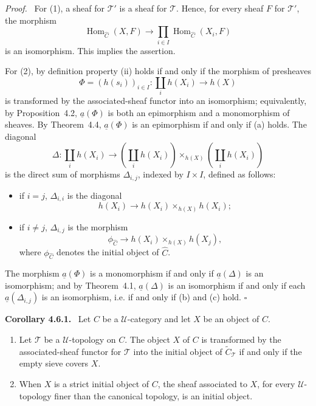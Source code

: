 \documentclass[11pt]{article}
\newcommand{\U}{\mathcal{U}}
\newcommand{\Hom}{\operatorname{Hom}}
\newcommand{\qedtext}{\hfill\(\square\)}
\newenvironment{statement}[1]{\par\medskip\noindent\textbf{#1.}\ }{\par\medskip}
\newenvironment{prooftext}{\par\noindent\emph{Proof.}\ }{\par\medskip}
\begin{document}
\begin{prooftext}
For (1), a sheaf for \(\mathcal T'\) is a sheaf for \(\mathcal T\). Hence, for every sheaf \(F\) for \(\mathcal T'\), the morphism
\[
\Hom_{\widehat C}(X,F)\longrightarrow \prod_{i\in I}\Hom_{\widehat C}(X_i,F)
\]
is an isomorphism. This implies the assertion.

For (2), by definition property (ii) holds if and only if the morphism of presheaves
\[
\Phi=(h(s_i))_{i\in I}:\coprod_i h(X_i)\longrightarrow h(X)
\]
is transformed by the associated-sheaf functor into an isomorphism; equivalently, by Proposition~4.2, \(\underline a(\Phi)\) is both an epimorphism and a monomorphism of sheaves. By Theorem~4.4, \(\underline a(\Phi)\) is an epimorphism if and only if (a) holds. The diagonal
\[
\Delta:\coprod_i h(X_i)\longrightarrow
\left(\coprod_i h(X_i)\right)\times_{h(X)}\left(\coprod_i h(X_i)\right)
\]
is the direct sum of morphisms \(\Delta_{i,j}\), indexed by \(I\times I\), defined as follows:
\begin{itemize}
\item if \(i=j\), \(\Delta_{i,i}\) is the diagonal
\[
h(X_i)\to h(X_i)\times_{h(X)}h(X_i);
\]
\item if \(i\ne j\), \(\Delta_{i,j}\) is the morphism
\[
\phi_{\widehat C}\to h(X_i)\times_{h(X)}h(X_j),
\]
where \(\phi_{\widehat C}\) denotes the initial object of \(\widehat C\).
\end{itemize}
The morphism \(\underline a(\Phi)\) is a monomorphism if and only if \(\underline a(\Delta)\) is an isomorphism; and by Theorem~4.1, \(\underline a(\Delta)\) is an isomorphism if and only if each \(\underline a(\Delta_{i,j})\) is an isomorphism, i.e. if and only if (b) and (c) hold. \qedtext
\end{prooftext}

\begin{statement}{Corollary 4.6.1}
Let \(C\) be a \(\U\)-category and let \(X\) be an object of \(C\).
\begin{enumerate}[label=\arabic*)]
\item Let \(\mathcal T\) be a \(\U\)-topology on \(C\). The object \(X\) of \(C\) is transformed by the associated-sheaf functor for \(\mathcal T\) into the initial object of \(\widetilde C_{\mathcal T}\) if and only if the empty sieve covers \(X\).
\item When \(X\) is a strict initial object of \(C\), the sheaf associated to \(X\), for every \(\U\)-topology finer than the canonical topology, is an initial object.
\end{enumerate}
\end{statement}
\end{document}
